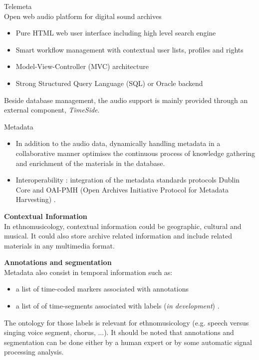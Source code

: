 \documentclass[final, hyperref, table]{beamer}
\begin{document}
\begin{frame}[containsverbatim]{}
\begin{columns}[T]
\begin{column}[T]{.49\linewidth}
\begin{block}{{\Large Telemeta}\\Open web audio platform for digital sound archives}
\begin{multicols}{2}[]
        \begin{itemize}
        \item \alert{Pure HTML} web user interface including high level \alert{search engine}
        \item \alert{Smart workflow management} with contextual user lists, profiles and rights
        \item Model-View-Controller (\alert{MVC}) architecture 
        \item Strong Structured Query Language (\alert{SQL}) or Oracle backend
        \end{itemize}
\end{multicols}
        Beside database management, the audio support is mainly provided through an external component, \emph{TimeSide}.
        
      \end{block}
      \begin{block}{Metadata}
        \vspace{-0.5cm}
        \begin{itemize}
        \item In addition to the audio data, dynamically handling metadata in a \alert{collaborative} manner optimises
          the continuous process of knowledge gathering and enrichment of
          the materials in the database.
        \item Interoperability : integration of the metadata standards protocols \alert{Dublin Core}
          and \alert{OAI-PMH} (Open Archives Initiative Protocol for Metadata
          Harvesting) \cite{DublinCore,OAI-PMH}.
        \end{itemize}
        
        \textbf{Contextual Information}\\
        In ethnomusicology, contextual information could be geographic, cultural and musical. It could also store archive related information and include related materials in any multimedia format. 
        
        \textbf{Annotations and segmentation}\\
        Metadata also consist in temporal information such as:
        \begin{itemize}
        \item a list of \alert{time-coded markers} associated with annotations
        \item a list of of \alert{time-segments} associated with labels (\emph{in development}) .
        \end{itemize}
        The ontology for those labels is relevant for ethnomusicology (e.g. speech versus singing voice segment, chorus, ...).
        It should be noted that annotations and segmentation can be done either by a human expert or by some automatic signal processing analysis.
      \end{block}
      

\end{column}
\end{columns}
\end{frame}
\end{document}
